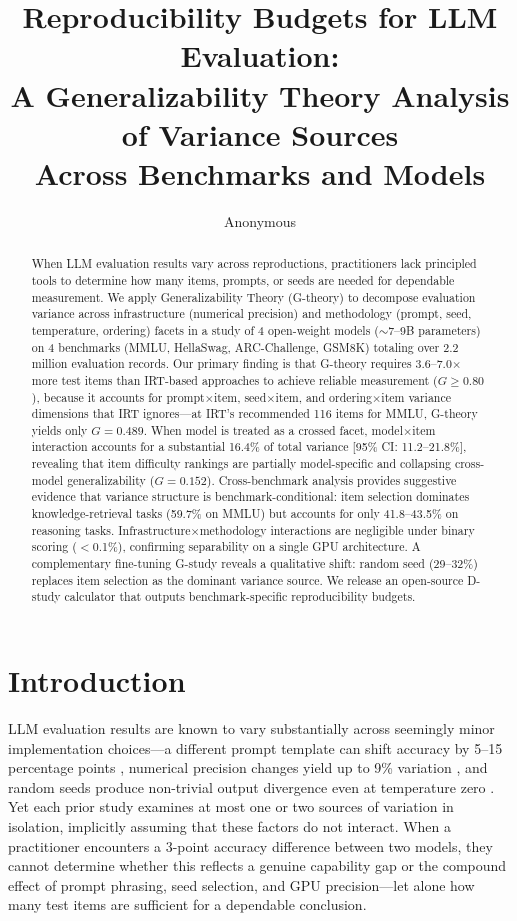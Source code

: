 \documentclass[11pt,letterpaper]{article}
\title{Reproducibility Budgets for LLM Evaluation:\\ A Generalizability Theory Analysis of Variance Sources\\ Across Benchmarks and Models}
\author{Anonymous}
\begin{document}
\maketitle

\begin{abstract}
When LLM evaluation results vary across reproductions, practitioners lack principled tools to determine how many items, prompts, or seeds are needed for dependable measurement.
We apply Generalizability Theory (G-theory) to decompose evaluation variance across infrastructure (numerical precision) and methodology (prompt, seed, temperature, ordering) facets in a study of 4 open-weight models ($\sim$7--9B parameters) on 4 benchmarks (MMLU, HellaSwag, ARC-Challenge, GSM8K) totaling over 2.2 million evaluation records.
Our primary finding is that G-theory requires 3.6--7.0$\times$ more test items than IRT-based approaches to achieve reliable measurement ($G \geq 0.80$), because it accounts for prompt$\times$item, seed$\times$item, and ordering$\times$item variance dimensions that IRT ignores---at IRT's recommended 116 items for MMLU, G-theory yields only $G = 0.489$.
When model is treated as a crossed facet, model$\times$item interaction accounts for a substantial 16.4\% of total variance [95\% CI: 11.2--21.8\%], revealing that item difficulty rankings are partially model-specific and collapsing cross-model generalizability ($G = 0.152$).
Cross-benchmark analysis provides suggestive evidence that variance structure is benchmark-conditional: item selection dominates knowledge-retrieval tasks (59.7\% on MMLU) but accounts for only 41.8--43.5\% on reasoning tasks.
Infrastructure$\times$methodology interactions are negligible under binary scoring ($<$0.1\%), confirming separability on a single GPU architecture.
A complementary fine-tuning G-study reveals a qualitative shift: random seed (29--32\%) replaces item selection as the dominant variance source.
We release an open-source D-study calculator that outputs benchmark-specific reproducibility budgets.
\end{abstract}

\section{Introduction}

LLM evaluation results are known to vary substantially across seemingly minor implementation choices---a different prompt template can shift accuracy by 5--15 percentage points \citep{mizrahi2024brittlebench}, numerical precision changes yield up to 9\% variation \citep{yuan2025hardware}, and random seeds produce non-trivial output divergence even at temperature zero \citep{gruver2025thinkingmachines}.
Yet each prior study examines at most one or two sources of variation in isolation, implicitly assuming that these factors do not interact.
When a practitioner encounters a 3-point accuracy difference between two models, they cannot determine whether this reflects a genuine capability gap or the compound effect of prompt phrasing, seed selection, and GPU precision---let alone how many test items are sufficient for a dependable conclusion.
\end{document}
